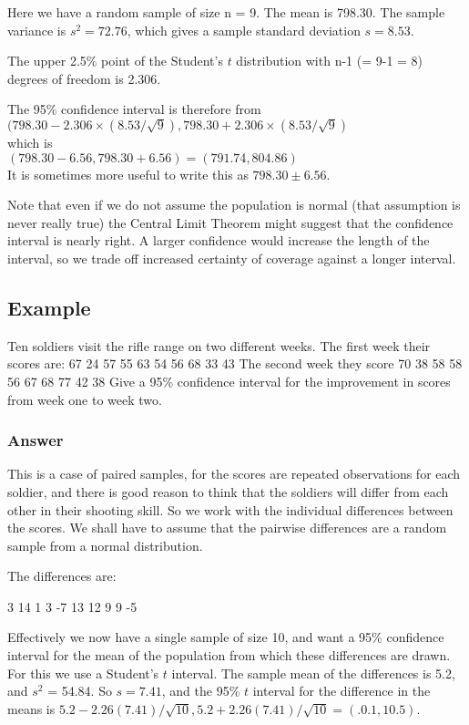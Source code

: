 Here we have a random sample of size n = 9. The mean is 798.30. The sample
variance is $s^2 = 72.76$, which gives a sample standard deviation $s = 8.53$.

The upper 2.5\% point of the Student's $t$ distribution with n-1 (= 9-1 = 8) degrees of freedom is 2.306.

The 95\% confidence interval is therefore from \\
$(798.30 - 2.306 \times (8.53/\sqrt{9}), 798.30 + 2.306 \times (8.53/\sqrt{9})$\\
which is\\
$(798.30 - 6.56, 798.30 + 6.56) = (791.74, 804.86)$\\
It is sometimes more useful to write this as $798.30 \pm 6.56$.

Note that even if we do not assume the population is normal (that assumption is
never really true) the Central Limit Theorem might suggest that the confidence interval
is nearly right. A larger confidence would increase the length of the interval, so we
trade off increased certainty of coverage against a longer interval.

\subsection{Example}
Ten soldiers visit the rifle range on two different weeks. The first
week their scores are:
67 24 57 55 63 54 56 68 33 43
The second week they score
70 38 58 58 56 67 68 77 42 38
Give a 95\% confidence interval for the improvement in scores from week one to
week two.


\subsubsection{Answer}


This is a case of paired samples, for the scores are repeated observations for each
soldier, and there is good reason to think that the soldiers will differ from each other
in their shooting skill. So we work with the individual differences between the scores.
We shall have to assume that the pairwise differences are a random sample from a
normal distribution.

The differences are:

3 14 1 3 -7 13 12 9 9 -5


Effectively we now have a single sample of size 10, and want a 95\% confidence
interval for the mean of the population from which these differences are drawn. For
this we use a Student's $t$ interval. The sample mean of the differences is 5.2, and
$s^2$ = 54.84. So $s = 7.41$, and the 95\% $t$ interval for the difference in the means is
$5.2 - 2.26(7.41)/\sqrt{10},  5.2 + 2.26(7.41)/\sqrt{10} = (.0.1, 10.5)$.

